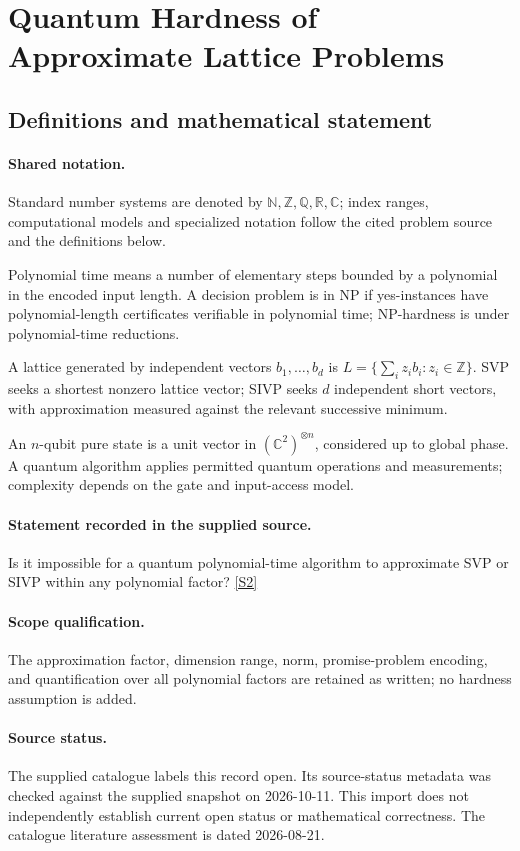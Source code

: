 \documentclass[11pt]{article}
\newcommand{\sref}[2]{\hyperlink{source:#1:#2}{[S#2]}}
\begin{document}
\section{Quantum Hardness of Approximate Lattice Problems}\label{statement}

\subsection{Definitions and mathematical statement}

\paragraph{Shared notation.}Standard number systems are denoted by $\mathbb N,\mathbb Z,\mathbb Q,\mathbb R,\mathbb C$; index ranges, computational models and specialized notation follow the cited problem source and the definitions below.


Polynomial time means a number of elementary steps bounded by a polynomial in the encoded input length. A decision problem is in $\mathrm{NP}$ if yes-instances have polynomial-length certificates verifiable in polynomial time; NP-hardness is under polynomial-time reductions.

A lattice generated by independent vectors $b_1,\ldots,b_d$ is $L=\{\sum_i z_i b_i:z_i\in\mathbb Z\}$. SVP seeks a shortest nonzero lattice vector; SIVP seeks $d$ independent short vectors, with approximation measured against the relevant successive minimum.

An $n$-qubit pure state is a unit vector in $(\mathbb C^2)^{\otimes n}$, considered up to global phase. A quantum algorithm applies permitted quantum operations and measurements; complexity depends on the gate and input-access model.
\paragraph{Statement recorded in the supplied source.}
Is it impossible for a quantum polynomial-time algorithm to approximate SVP or SIVP within any polynomial factor? \sref{statement}{2}
\paragraph{Scope qualification.}
The approximation factor, dimension range, norm, promise-problem encoding, and quantification over all polynomial factors are retained as written; no hardness assumption is added.
\paragraph{Source status.}
The supplied catalogue labels this record open. Its source-status metadata was checked against the supplied snapshot on 2026-10-11. This import does not independently establish current open status or mathematical correctness. The catalogue literature assessment is dated 2026-08-21.
\end{document}
